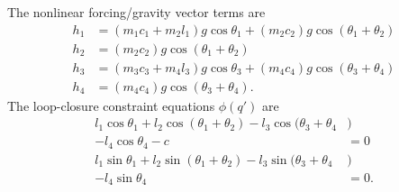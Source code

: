 \documentclass[10pt,final,journal,letterpaper,oneside,twocolumn]{IEEEtran}
\begin{document}
The nonlinear forcing/gravity vector terms are
\begin{align}
  h_1 &= (m_1c_1+m_2l_1)g\cos\theta_1 +
        (m_2c_2)g\cos(\theta_1+\theta_2)\nonumber\\
  h_2 &= (m_2c_2)g\cos(\theta_1+\theta_2)\nonumber\\
  h_3 &= (m_3c_3+m_4l_3)g\cos\theta_3 +
        (m_4c_4)g\cos(\theta_3+\theta_4)\nonumber\\
  h_4 &= (m_4c_4)g\cos(\theta_3+\theta_4).
  \label{eq:gravterms}
\end{align}
The loop-closure constraint equations $\phi(q')$ are
\begin{align}
  l_1\cos\theta_1 + l_2\cos(\theta_1+\theta_2) -
  l_3\cos(\theta_3+\theta_4&)\nonumber\\
  - l_4\cos\theta_4 - c &= 0\nonumber\\
  l_1\sin\theta_1 + l_2\sin(\theta_1+\theta_2) -
  l_3\sin(\theta_3+\theta_4&)\nonumber\\
  - l_4\sin\theta_4 &= 0.
  \label{eq:lcconst}
\end{align}
  


\end{document}
